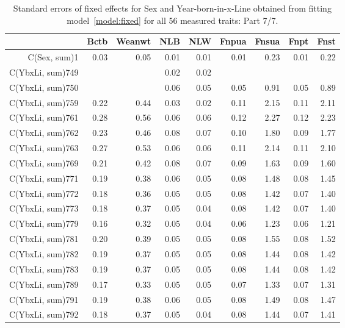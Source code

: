 \begin{table}[p]
\centering
\caption{Standard errors of fixed effects for Sex and Year-born-in-x-Line obtained from fitting model~\ref{model:fixed} for all 56 measured traits: Part 7/7.}
\label{tab:seb7}
\begin{tabular}{rrrrrrrrr}
  \hline
 & Bctb & Weanwt & NLB & NLW & Fnpua & Fnsua & Fnpt & Fnst \\ 
  \hline
C(Sex, sum)1 & 0.03 & 0.05 & 0.01 & 0.01 & 0.01 & 0.23 & 0.01 & 0.22 \\ 
  C(YbxLi, sum)749 &  &  & 0.02 & 0.02 &  &  &  &  \\ 
  C(YbxLi, sum)750 &  &  & 0.06 & 0.05 & 0.05 & 0.91 & 0.05 & 0.89 \\ 
  C(YbxLi, sum)759 & 0.22 & 0.44 & 0.03 & 0.02 & 0.11 & 2.15 & 0.11 & 2.11 \\ 
  C(YbxLi, sum)761 & 0.28 & 0.56 & 0.06 & 0.06 & 0.12 & 2.27 & 0.12 & 2.23 \\ 
  C(YbxLi, sum)762 & 0.23 & 0.46 & 0.08 & 0.07 & 0.10 & 1.80 & 0.09 & 1.77 \\ 
  C(YbxLi, sum)763 & 0.27 & 0.53 & 0.06 & 0.06 & 0.11 & 2.14 & 0.11 & 2.10 \\ 
  C(YbxLi, sum)769 & 0.21 & 0.42 & 0.08 & 0.07 & 0.09 & 1.63 & 0.09 & 1.60 \\ 
  C(YbxLi, sum)771 & 0.19 & 0.38 & 0.06 & 0.05 & 0.08 & 1.48 & 0.08 & 1.45 \\ 
  C(YbxLi, sum)772 & 0.18 & 0.36 & 0.05 & 0.05 & 0.08 & 1.42 & 0.07 & 1.40 \\ 
  C(YbxLi, sum)773 & 0.18 & 0.37 & 0.05 & 0.04 & 0.08 & 1.42 & 0.07 & 1.40 \\ 
  C(YbxLi, sum)779 & 0.16 & 0.32 & 0.05 & 0.04 & 0.06 & 1.23 & 0.06 & 1.21 \\ 
  C(YbxLi, sum)781 & 0.20 & 0.39 & 0.05 & 0.05 & 0.08 & 1.55 & 0.08 & 1.52 \\ 
  C(YbxLi, sum)782 & 0.19 & 0.37 & 0.05 & 0.05 & 0.08 & 1.44 & 0.08 & 1.42 \\ 
  C(YbxLi, sum)783 & 0.19 & 0.37 & 0.05 & 0.05 & 0.08 & 1.44 & 0.08 & 1.42 \\ 
  C(YbxLi, sum)789 & 0.17 & 0.33 & 0.05 & 0.05 & 0.07 & 1.33 & 0.07 & 1.31 \\ 
  C(YbxLi, sum)791 & 0.19 & 0.38 & 0.06 & 0.05 & 0.08 & 1.49 & 0.08 & 1.47 \\ 
  C(YbxLi, sum)792 & 0.18 & 0.37 & 0.05 & 0.04 & 0.08 & 1.44 & 0.07 & 1.41 \\ 

\end{tabular}
\end{table}
